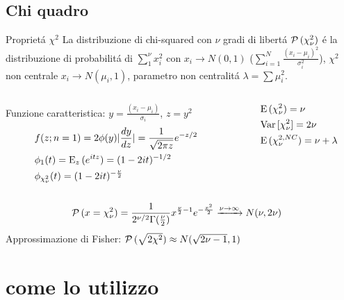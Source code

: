 \documentclass[asd-beamer.tex]{subfiles}
\begin{document}
\subsection{Chi quadro}

\begin{frame}{Propriet\'a $\chi^2$}
La distribuzione di chi-squared con $\nu$ gradi di libert\'a $\prob{(\chi_{\nu}^2)}$ \'e la distribuzione di probabilit\'a di $\sum_1^{\nu}x_i^2$ con $x_i\to N(0,1)$ ($\sum_{i=1}^N\frac{(x_i-\mu_i)^2}{\sigma_i^2}$), $\chi^2$ non centrale $x_i\to N(\mu_i,1)$, parametro non centralit\'a $\lambda=\sum\mu_i^2$.
\begin{columns}[T]
	\begin{column}{0.7\textwidth}
Funzione caratteristica: $y=\frac{(x_i-\mu_i)}{\sigma_i}$, $z=y^2$
		\begin{align*}
		&f(z;n=1)=2\phi(y)|\TDy{z}{y}|=\frac{1}{\sqrt{2\pi z}}\exp{-z/2}\\
		&\phi_1(t)=\E_z{(\exp{itz})}=(1-2it)\expy{-1/2}\\
		&\phi_{\chi^2_{\nu}}(t)=(1-2it)\expy{-\frac{\nu}{2}}
		\end{align*}
	\end{column}
	\begin{column}{0.3\textwidth}
		\begin{align*}
		&\E{(\chi^2_{\nu})}=\nu\\
		&\var{[\chi_{\nu}^2]}=2\nu\\
		&\E{(\chi^{2,NC}_{\nu})}=\nu+\lambda
		\end{align*}
	\end{column}
\end{columns}
\begin{align*}
&\prob{(x=\chi^2_{\nu})}=\frac{1}{2\expy{\nu/2}\Gamma(\frac{\nu}{2})}x\expy{\frac{\nu}{2}-1}\exp{-\frac{x^2}{2}}\xrightarrow{\nu\to\infty}N(\nu,2\nu)
\end{align*}
Approssimazione di Fisher: $\prob{(\sqrt{2\chi^2})}\approx N(\sqrt{2\nu-1},1)$
\end{frame}

\section{come lo utilizzo}
\end{document}
